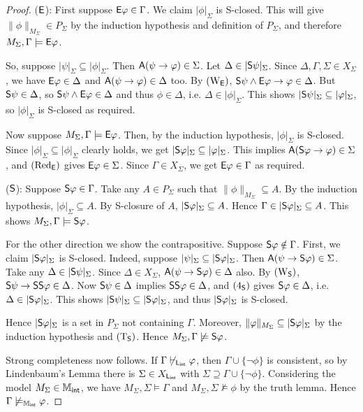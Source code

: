 \begin{proof}
    ($\E$): First suppose $\E\phi \in \Gamma$. We claim $|\phi|_\Sigma$ is
    S-closed. This will give $\|\phi\|_{M_\Sigma} \in P_\Sigma$ by the
    induction hypothesis and definition of $P_\Sigma$, and therefore $M_\Sigma,
    \Gamma \models \E\phi$.

    So, suppose $|\psi|_\Sigma \subseteq |\phi|_\Sigma$. Then
    $\A(\psi \limplies \phi) \in \Sigma$. Let $\Delta \in
    |\S\psi|_\Sigma$. Since $\Delta, \Gamma, \Sigma \in X_\Sigma$,
    we have $\E\phi \in \Delta$ and $\A(\psi \limplies \phi) \in
    \Delta$ too. By $\weakeningE$, $\S\psi \land \E\phi \limplies
    \phi \in \Delta$. But $\S\psi \in \Delta$, so $\S\psi \land
    \E\phi \in \Delta$ and thus $\phi \in \Delta$, i.e.  $\Delta
    \in |\phi|_\Sigma$. This shows $|\S\psi|_\Sigma \subseteq
    |\phi|_\Sigma$, so $|\phi|_\Sigma$ is S-closed as required.

    Now suppose $M_\Sigma, \Gamma \models \E\phi$. Then, by the
    induction hypothesis, $|\phi|_\Sigma$ is S-closed. Since
    $|\phi|_\Sigma \subseteq |\phi|_\Sigma$ clearly holds, we get
    $|\S\phi|_\Sigma \subseteq |\phi|_\Sigma$. This implies
    $\A(\S\phi \limplies \phi) \in \Sigma$, and $\redE$ gives
    $\E\phi \in \Sigma$. Since $\Gamma \in X_\Sigma$, we get
    $\E\phi \in \Gamma$ as required.

    ($\S$): Suppose $\S\phi \in \Gamma$. Take any $A \in P_\Sigma$
    such that $\|\phi\|_{M_\Sigma} \subseteq A$. By the induction
    hypothesis, $|\phi|_\Sigma \subseteq A$. By S-closure of $A$,
    $|\S\phi|_\Sigma \subseteq A$. Hence $\Gamma \in
    |\S\phi|_\Sigma \subseteq A$. This shows $M_\Sigma, \Gamma
    \models \S\phi$.

    For the other direction we show the contrapositive. Suppose
    $\S\phi \notin \Gamma$. First, we claim $|\S\phi|_\Sigma$ is
    S-closed. Indeed, suppose $|\psi|_\Sigma \subseteq
    |\S\phi|_\Sigma$. Then $\A(\psi \limplies \S\phi) \in \Sigma$.
    Take any $\Delta \in |\S\psi|_\Sigma$. Since $\Delta \in
    X_\Sigma$, $\A(\psi \limplies \S\phi) \in \Delta$ also. By
    $\weakeningS$, $\S\psi \limplies \S\S\phi \in \Delta$.  Now
    $\S\psi \in \Delta$ implies $\S\S\phi \in \Delta$, and
    $\foursoundness$ gives $\S\phi \in \Delta$, i.e.  $\Delta \in
    |\S\phi|_\Sigma$. This shows $|\S\psi|_\Sigma \subseteq
    |\S\phi|_\Sigma$, and thus $|\S\phi|_\Sigma$ is S-closed.

    Hence $|\S\phi|_\Sigma$ is a set in $P_\Sigma$ not containing
    $\Gamma$. Moreover, $\|\phi\|_{M_\Sigma} \subseteq
    |\S\phi|_\Sigma$ by the induction hypothesis and $\Tsoundness$.
    Hence $M_\Sigma, \Gamma \not\models \S\phi$.

    Strong completeness now follows. If $\Gamma \not\entails_{\sLint} \phi$, then
    $\Gamma \cup \{\neg\phi\}$ is consistent, so by Lindenbaum's Lemma
    there is $\Sigma \in X_{\sLint}$ with $\Sigma \supseteq \Gamma \cup
    \{\neg\phi\}$.  Considering the model $M_\Sigma \in \Mint$, we have
    $M_\Sigma, \Sigma \models \Gamma$ and $M_\Sigma, \Sigma \not\models
    \phi$ by the truth lemma. Hence $\Gamma \not\models_{\Mint} \phi$.
\end{proof}

